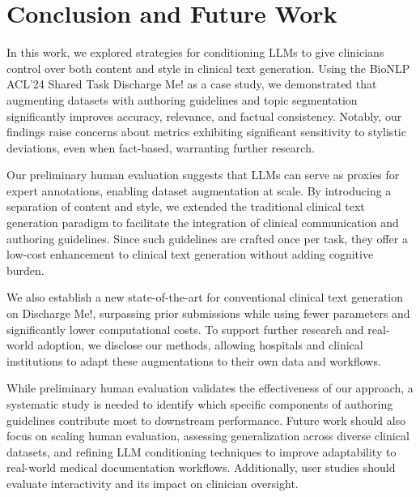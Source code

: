 
\section{Conclusion and Future Work}
In this work, we explored strategies for conditioning LLMs to give clinicians control over both content and style in clinical text generation. Using the BioNLP ACL'24 Shared Task Discharge Me! as a case study, we demonstrated that augmenting datasets with authoring guidelines and topic segmentation significantly improves accuracy, relevance, and factual consistency. Notably, our findings raise concerns about metrics exhibiting significant sensitivity to stylistic deviations, even when fact-based, warranting further research.

Our preliminary human evaluation suggests that LLMs can serve as proxies for expert annotations, enabling dataset augmentation at scale. By introducing a separation of content and style, we extended the traditional clinical text generation paradigm to facilitate the integration of clinical communication and authoring guidelines. Since such guidelines are crafted once per task, they offer a low-cost enhancement to clinical text generation without adding cognitive burden.

We also establish a new state-of-the-art for conventional clinical text generation on Discharge Me!, surpassing prior submissions while using fewer parameters and significantly lower computational costs. To support further research and real-world adoption, we disclose our methods, allowing hospitals and clinical institutions to adapt these augmentations to their own data and workflows.

While preliminary human evaluation validates the effectiveness of our approach, a systematic study is needed to identify which specific components of authoring guidelines contribute most to downstream performance. Future work should also focus on scaling human evaluation, assessing generalization across diverse clinical datasets, and refining LLM conditioning techniques to improve adaptability to real-world medical documentation workflows. Additionally, user studies should evaluate interactivity and its impact on clinician oversight.


